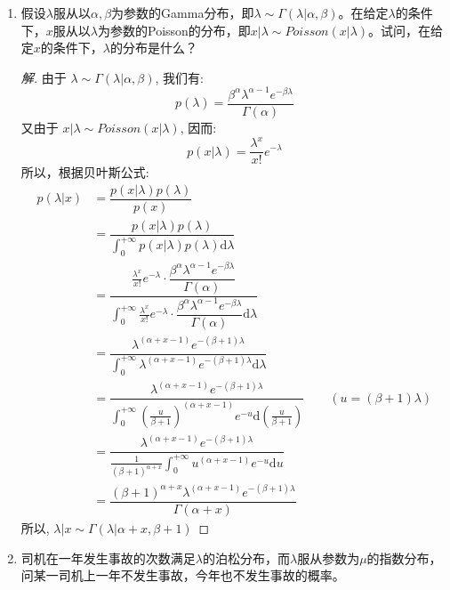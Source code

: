 \documentclass[12pt]{article}
\newcommand{\hei}{\CJKfamily{hei}}                          %
\begin{document}
\begin{enumerate}
\item {\hei 假设$\lambda$服从以$\alpha,\beta$为参数的Gamma分布，即$\lambda\sim \Gamma(\lambda|\alpha,\beta)$。在给定$\lambda$的条件下，$x$服从以$\lambda$为参数的Poisson的分布，即$x|\lambda\sim Poisson(x|\lambda)$。试问，在给定$x$的条件下，$\lambda$的分布是什么？}
\begin{proof}[解]
	由于 $\lambda \sim \Gamma(\lambda|\alpha,\beta)$, 我们有:
	\begin{equation}
	p(\lambda)=\dfrac{\beta^{\alpha}\lambda^{\alpha-1}e^{-\beta\lambda}}{\Gamma(\alpha)}
	\end{equation}
	又由于 $x|\lambda \sim Poisson(x|\lambda)$, 因而:
	\begin{equation}
	p(x|\lambda)=\frac{\lambda^x}{x!}e^{-\lambda}
	\end{equation}
	所以，根据贝叶斯公式:
	\begin{equation}
	\begin{aligned}
	p(\lambda|x)&=\dfrac{p(x|\lambda)p(\lambda)}{p(x)} \\
	&=\dfrac{p(x|\lambda)p(\lambda)}{\int_{0}^{+\infty}p(x|\lambda)p(\lambda)\mathrm{d}\lambda} \\
	&=\dfrac{\frac{\lambda^x}{x!}e^{-\lambda}\cdot\dfrac{\beta^{\alpha}\lambda^{\alpha-1}e^{-\beta\lambda}}{\Gamma(\alpha)}}{\int_{0}^{+\infty}\frac{\lambda^x}{x!}e^{-\lambda}\cdot\dfrac{\beta^{\alpha}\lambda^{\alpha-1}e^{-\beta\lambda}}{\Gamma(\alpha)}\mathrm{d}\lambda} \\
	&=\dfrac{\lambda^{(\alpha+x-1)}e^{-(\beta+1)\lambda}}{\int_{0}^{+\infty}\lambda^{(\alpha+x-1)}e^{-(\beta+1)\lambda}\mathrm{d}\lambda} \\
	&=\dfrac{\lambda^{(\alpha+x-1)}e^{-(\beta+1)\lambda}}{\int_{0}^{+\infty}\left(\frac{u}{\beta+1}\right)^{(\alpha+x-1)}e^{-u}\mathrm{d}\left(\frac{u}{\beta+1}\right)} \qquad (u=(\beta+1)\lambda) \\
	&=\dfrac{\lambda^{(\alpha+x-1)}e^{-(\beta+1)\lambda}}{\frac{1}{(\beta+1)^{\alpha+x}}\int_{0}^{+\infty}u^{(\alpha+x-1)}e^{-u}\mathrm{d}u} \\
	&=\dfrac{(\beta+1)^{\alpha+x}\lambda^{(\alpha+x-1)}e^{-(\beta+1)\lambda}}{\Gamma(\alpha+x)}
	\end{aligned}
	\end{equation}
	所以, $\lambda|x \sim \Gamma(\lambda|\alpha+x,\beta+1)$
\end{proof}
\item {\hei 司机在一年发生事故的次数满足$\lambda$的泊松分布，而$\lambda$服从参数为$\mu$的指数分布，问某一司机上一年不发生事故，今年也不发生事故的概率。}

\end{enumerate}
\end{document}
